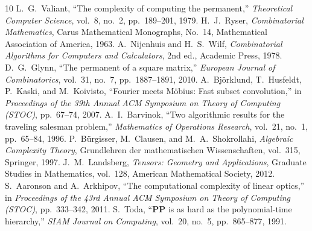 \documentclass[11pt,a4paper]{article}
\begin{document}
\begin{thebibliography}{10}
 L.~G.~Valiant, ``The complexity of computing the permanent,'' \emph{Theoretical Computer Science}, vol.~8, no.~2, pp.~189--201, 1979.
 H.~J.~Ryser, \emph{Combinatorial Mathematics}, Carus Mathematical Monographs, No.~14, Mathematical Association of America, 1963.
 A.~Nijenhuis and H.~S.~Wilf, \emph{Combinatorial Algorithms for Computers and Calculators}, 2nd ed., Academic Press, 1978.
 D.~G.~Glynn, ``The permanent of a square matrix,'' \emph{European Journal of Combinatorics}, vol.~31, no.~7, pp.~1887--1891, 2010.
 A.~Bj\"orklund, T.~Husfeldt, P.~Kaski, and M.~Koivisto, ``Fourier meets M\"obius: Fast subset convolution,'' in \emph{Proceedings of the 39th Annual ACM Symposium on Theory of Computing (STOC)}, pp.~67--74, 2007.
 A.~I.~Barvinok, ``Two algorithmic results for the traveling salesman problem,'' \emph{Mathematics of Operations Research}, vol.~21, no.~1, pp.~65--84, 1996.
 P.~B\"urgisser, M.~Clausen, and M.~A.~Shokrollahi, \emph{Algebraic Complexity Theory}, Grundlehren der mathematischen Wissenschaften, vol.~315, Springer, 1997.
 J.~M.~Landsberg, \emph{Tensors: Geometry and Applications}, Graduate Studies in Mathematics, vol.~128, American Mathematical Society, 2012.
 S.~Aaronson and A.~Arkhipov, ``The computational complexity of linear optics,'' in \emph{Proceedings of the 43rd Annual ACM Symposium on Theory of Computing (STOC)}, pp.~333--342, 2011.
 S.~Toda, ``$\mathbf{PP}$ is as hard as the polynomial-time hierarchy,'' \emph{SIAM Journal on Computing}, vol.~20, no.~5, pp.~865--877, 1991.
\end{thebibliography}
\end{document}
